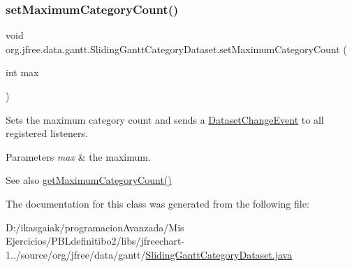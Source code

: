 \subsubsection{\texorpdfstring{set\+Maximum\+Category\+Count()}{setMaximumCategoryCount()}}
{\footnotesize\ttfamily void org.\+jfree.\+data.\+gantt.\+Sliding\+Gantt\+Category\+Dataset.\+set\+Maximum\+Category\+Count (\begin{DoxyParamCaption}\item[{int}]{max }\end{DoxyParamCaption})}

Sets the maximum category count and sends a \mbox{\hyperlink{}{Dataset\+Change\+Event}} to all registered listeners.


\begin{DoxyParams}{Parameters}
{\em max} & the maximum.\\
\hline
\end{DoxyParams}
\begin{DoxySeeAlso}{See also}
\mbox{\hyperlink{classorg_1_1jfree_1_1data_1_1gantt_1_1_sliding_gantt_category_dataset_a1d9df7bd70883ffa80bd7b5ea043757f}{get\+Maximum\+Category\+Count()}} 
\end{DoxySeeAlso}


The documentation for this class was generated from the following file\+:\begin{DoxyCompactItemize}
\item 
D\+:/ikasgaiak/programacion\+Avanzada/\+Mis Ejercicios/\+P\+B\+Ldefinitibo2/libs/jfreechart-\/1../source/org/jfree/data/gantt/\mbox{\hyperlink{_sliding_gantt_category_dataset_8java}{Sliding\+Gantt\+Category\+Dataset.\+java}}\end{DoxyCompactItemize}
